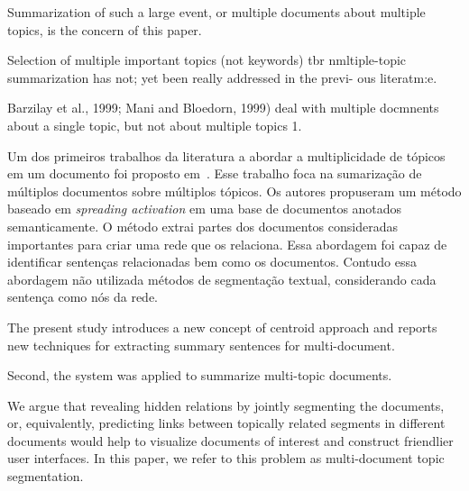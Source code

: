Summarization of such a large event, or multiple 
documents about multiple topics, is the
concern of this paper.


Selection of multiple important topics (not
keywords) tbr nmltiple-topic summarization has
not; yet been really addressed in the previ-
ous literatm:e.

 
Barzilay et al., 1999; Mani and Bloedorn, 1999) deal with multiple docmnents about a single topic, but not about multiple topics 1.  




Um dos primeiros trabalhos da literatura a abordar a multiplicidade de tópicos em um documento foi proposto em~\cite{}. Esse trabalho foca na sumarização de múltiplos documentos sobre múltiplos tópicos. Os autores propuseram um método baseado em \textit{spreading activation} em uma base de documentos anotados semanticamente. O método extrai partes dos documentos consideradas importantes para criar uma rede que os relaciona. Essa abordagem foi capaz de identificar sentenças relacionadas bem como os documentos. Contudo essa abordagem não utilizada métodos de segmentação textual, considerando cada sentença como nós da rede. 











The present study introduces a new concept of centroid approach and reports new techniques for extracting summary sentences for multi-document.


Second, the system was applied to summarize multi-topic documents.











We argue that revealing hidden
relations by jointly segmenting the documents, or, equivalently, 
predicting links between topically related segments in
different documents would help to visualize documents of interest 
and construct friendlier user interfaces. In this paper,
we refer to this problem as multi-document topic segmentation.




